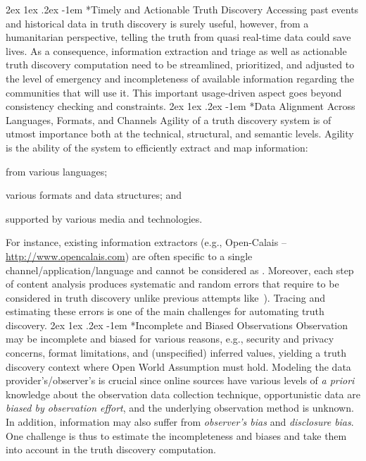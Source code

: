 \documentclass[prodmode,acmtecs]{acmsmall} %
\makeatletter
\renewcommand\paragraph{\@startsection{paragraph}{5}{\z@}%
                                       {2ex \@plus1ex \@minus .2ex}%
                                       {-1em}%
                                      {\sffamily\normalsize\bfseries}}
\makeatother
\begin{document}
\paragraph*{Timely and Actionable Truth Discovery} 
Accessing past events and historical data in truth discovery is surely useful, however,
from a humanitarian perspective, telling the truth from quasi real-time data 
could save lives. As a consequence, information extraction and triage as well as actionable
truth discovery computation need to be streamlined, prioritized,  and adjusted to the level 
of emergency and incompleteness of available information regarding the communities that will 
use it. This important usage-driven aspect goes beyond consistency checking and constraints.
%
\vspace*{-0.23cm}
\paragraph*{Data Alignment Across Languages, Formats, and Channels} 
Agility of a truth discovery system is of utmost importance both at 
the technical, structural, and semantic levels. 
Agility is the ability of the system 
to efficiently extract and map information: 
\begin{inparaenum}[(i)]
\item from various languages;
\item various formats and data structures; and
\item supported by various media and technologies.
\end{inparaenum}
For instance, existing information extractors (e.g., Open-Calais -- \url{http://www.opencalais.com})  
are often specific to a single channel/application/language and cannot be considered as . Moreover,
each step of content analysis produces systematic and random errors that 
require to be considered in truth discovery unlike previous attempts like~\cite{GoasdoueKKLMZ13}). 
Tracing and estimating  these errors is one of the main challenges for automating truth discovery. 
%
\vspace*{-0.23cm}
\paragraph*{Incomplete and Biased Observations}  
Observation may be incomplete and biased for various 
reasons, e.g., security and privacy concerns, format limitations, and 
(unspecified) inferred values, yielding a truth discovery context where Open World
Assumption must hold. Modeling the data provider's/observer's is crucial since online 
sources have  various levels of {\it a priori} knowledge about the observation data 
collection technique, opportunistic data are {\it biased by  observation effort}, and the underlying
observation method is unknown. In addition, information may also suffer from \emph{observer's bias} and
\emph{disclosure bias}. One challenge is thus to estimate the incompleteness and biases and take them into
account in the truth discovery computation.
%
\vspace*{-0.23cm}
\end{document}
